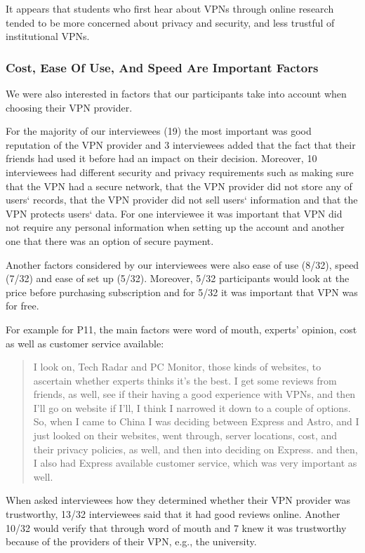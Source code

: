 It appears that students who first hear about VPNs through online research
tended to be more concerned about privacy and security, and less trustful of
institutional VPNs. 

\subsubsection{Cost, Ease Of Use, And Speed Are Important Factors} We were also interested in factors that
our participants take into account when choosing their VPN provider.

For the majority of our interviewees (19) the most
important was good reputation of the VPN provider and 3 interviewees added
that the fact that their friends had used it before had an impact on their
decision.  Moreover, 10 interviewees had different
security and privacy requirements such as making sure that the VPN had a secure network,
that the VPN provider did not store any of users‘ records, that the VPN provider did
not sell users‘ information and that the VPN protects users‘ data. For one
interviewee it was important that VPN did not require any personal information
when setting up the account and another one that there was an option of secure
payment. 

 Another factors considered by our interviewees were also
ease of use (8/32), speed (7/32) and ease of set up (5/32). Moreover, 5/32 participants
would look at the price before purchasing subscription and for 5/32 it was
important that VPN was for free.   

For example for P11, the main factors were word of mouth, experts’ opinion,
cost as well as customer service available: \begin{quote} I look
    on, Tech Radar and PC Monitor, those kinds of websites, to ascertain
    whether experts thinks it's the best. I get some reviews from friends, as
    well, see if their having a good experience with VPNs, and then I'll go on
    website if I'll, I think I narrowed it down to a couple of
    options. So, when I came to China I was deciding between Express and
    Astro, and I just looked on their websites, went through, server
    locations, cost, and their privacy policies, as well, and then into
    deciding on Express. and then, I also had Express available
customer service, which was very important as well.\end{quote}

When asked interviewees how they determined whether
their VPN provider was trustworthy, 13/32 interviewees said that it had
good reviews online. Another 10/32 would verify that through word of mouth and 7
knew it was trustworthy because of the providers of their VPN, e.g., the
university. 

